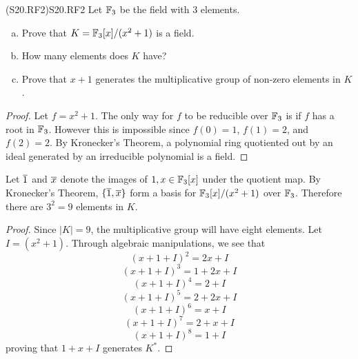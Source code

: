 \documentclass[../../AlgebraQualSolutions.tex]{subfiles}
\begin{document}
\begin{prob}{(S20.RF2)}{S20.RF2}
Let $\mathbb{F}_3$ be the field with 3 elements.
\begin{enumerate}[(a)]
\item Prove that $K = \mathbb{F}_3[x]/(x^2 + 1)$ is a field.
\item How many elements does $K$ have?
\item Prove that $x+1$ generates the multiplicative group of non-zero elements in $K$.
\end{enumerate}
\end{prob}

\begin{proof}
	Let $f = x^2 + 1$. The only way for $f$ to be reducible over $\mathbb{F}_3$ is if $f$ has a root in $\mathbb{F}_3$. However this is impossible since $f(0) = 1$, $f(1) = 2$, and $f(2) = 2$. By Kronecker's Theorem, a polynomial ring quotiented out by an ideal generated by an irreducible polynomial is a field.
\end{proof}

\begin{solution}
	Let $\overline{1}$ and $\overline{x}$ denote the images of $1,x \in \mathbb{F}_3[x]$ under the quotient map. By Kronecker's Theorem, $\{\overline{1},\overline{x}\}$ form a basis for $\mathbb{F}_3[x]/(x^2 + 1)$ over $\mathbb{F}_3$. Therefore there are $3^2 = 9$ elements in $K$.
\end{solution}

\begin{proof}
	Since $|K| = 9$, the multiplicative group will have eight elements. Let $I = (x^2 + 1)$. Through algebraic manipulations, we see that 
		\[(x+1+I)^2 = 2x + I\]
		\[(x+1+I)^3 = 1 + 2x + I\]
		\[(x+1+I)^4 = 2 + I\]
		\[(x+1+I)^5 = 2 + 2x + I\]
		\[(x+1+I)^6 = x + I\]
		\[(x+1+I)^7 = 2 + x + I\]
		\[(x+1+I)^8 = 1 + I\]
	proving that $1 + x + I$ generates $K^*$.
\end{proof}
\end{document}
